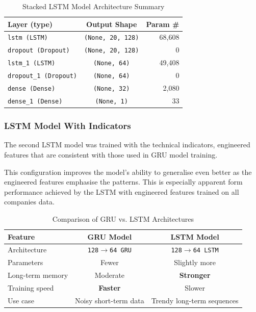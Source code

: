 \begin{table}[h]
    \centering
    \begin{tabular}{|l|c|r|}
        \hline
        \textbf{Layer (type)} & \textbf{Output Shape} & \textbf{Param \#} \\
        \hline
        \hline
        \texttt{lstm (LSTM)} & \texttt{(None, 20, 128)} & 68,608 \\
        \hline
        \texttt{dropout (Dropout)} & \texttt{(None, 20, 128)} & 0 \\
        \hline
        \texttt{lstm\_1 (LSTM)} & \texttt{(None, 64)} & 49,408 \\
        \hline
        \texttt{dropout\_1 (Dropout)} & \texttt{(None, 64)} & 0 \\
        \hline
        \texttt{dense (Dense)} & \texttt{(None, 32)} & 2,080 \\
        \hline
        \texttt{dense\_1 (Dense)} & \texttt{(None, 1)} & 33 \\
        \hline
    \end{tabular}
    \caption{Stacked LSTM Model Architecture Summary}
    \label{tab:stacked_lstm_summary}
\end{table}

\subsubsection{LSTM Model With Indicators}

The second LSTM model was trained with the technical indicators, engineered features that are consistent with those used in GRU model training.

This configuration improves the model’s ability to generalise even better as the engineered features emphasise the patterns. This is especially apparent form performance achieved by the LSTM with engineered features trained on all companies data.

\begin{table}[h]
    \centering
    \begin{tabular}{|l|c|c|}
        \hline
        \textbf{Feature} & \textbf{GRU Model} & \textbf{LSTM Model} \\
        \hline
        \hline
        Architecture & \texttt{128$\rightarrow$64 GRU} & \texttt{128$\rightarrow$64 LSTM} \\
        \hline
        Parameters & Fewer & Slightly more \\
        \hline
        Long-term memory & Moderate & \textbf{Stronger} \\
        \hline
        Training speed & \textbf{Faster} & Slower \\
        \hline
        Use case & Noisy short-term data & Trendy long-term sequences \\
        \hline
    \end{tabular}
    \caption{Comparison of GRU vs. LSTM Architectures}
    \label{tab:gru_lstm_comparison}
\end{table}

